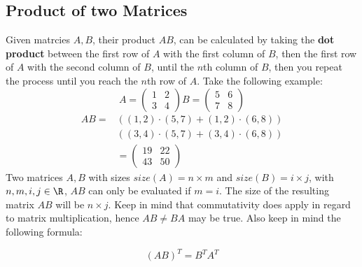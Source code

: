 \documentclass[a4paper]{article}
\begin{document}
  \subsection{Product of two Matrices}
  Given matrcies $A,B$, their product $AB$, can be calculated by taking the \textbf{dot product} between the first row of $A$ with the first column of $B$, then the first row of $A$ with the second column of $B$, until the $n$th column of $B$, then you repeat the process until you reach the $n$th row of $A$. Take the following example:
  \[
    A = \begin{pmatrix}
      1 & 2 \\ 3 & 4 
    \end{pmatrix}
    B = \begin{pmatrix}
      5 & 6 \\ 7 & 8 
    \end{pmatrix}
  \]
  \[
    \begin{split}
      AB = &((1,2) \cdot (5,7) + (1,2) \cdot (6,8))\\
         & ((3,4)\cdot (5,7) + (3,4) \cdot (6,8))\\
         &= \begin{pmatrix}
           19 & 22 \\ 43 & 50
         \end{pmatrix}
    \end{split}
  \]
  Two matrices $A,B$ with sizes $size(A) = n \times m$ and $size(B) = i \times j$, with $n,m,i,j \in \R$, $AB$ can only be evaluated if $m = i$. The size of the resulting matrix $AB$ will be $n\times j$. Keep in mind that commutativity does apply in regard to matrix multiplication, hence $AB \not = BA$ may be true. Also keep in mind the following formula:

  \[
    (AB)^T = B^T A^T
  \]
\end{document}

